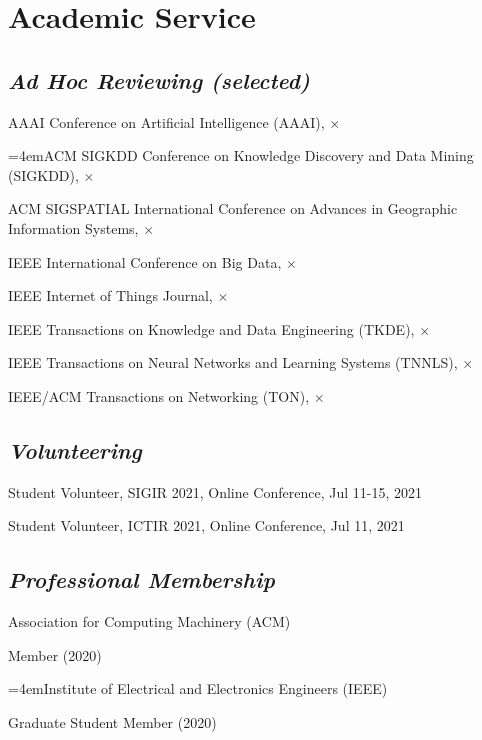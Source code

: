 
\vspace{-8pt}
\section*{Academic Service}
\vspace{-4pt}


\subsection*{\textnormal{\textit{Ad Hoc Reviewing (selected)}}}
\vspace{-4pt}
\indent

AAAI Conference on Artificial Intelligence (AAAI), $\times$

\hangindent=4emACM SIGKDD Conference on Knowledge Discovery and Data Mining (SIGKDD), $\times$

ACM SIGSPATIAL International Conference on Advances in Geographic Information Systems, $\times$

IEEE International Conference on Big Data, $\times$

IEEE Internet of Things Journal, $\times$


IEEE Transactions on Knowledge and Data Engineering (TKDE), $\times$

IEEE Transactions on Neural Networks and Learning Systems (TNNLS), $\times$

IEEE/ACM Transactions on Networking (TON), $\times$


\subsection*{\textnormal{\textit{Volunteering}}}
\vspace{-4pt}
\indent 

Student Volunteer, SIGIR 2021, Online Conference, Jul 11-15, 2021

Student Volunteer, ICTIR 2021, Online Conference, Jul 11, 2021

\subsection*{\textnormal{\textit{Professional Membership}}}
\vspace{-4pt}
\indent 

Association for Computing Machinery (ACM)  

\hspace{2em}Member (2020)

\hangindent=4emInstitute of Electrical and Electronics Engineers (IEEE)

\hspace{2em}Graduate Student Member (2020)
